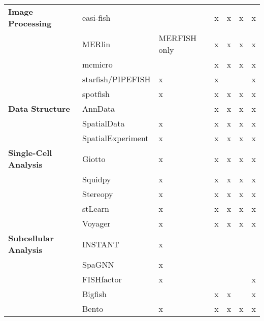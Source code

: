 \begin{dissertationintroduction}
\begin{small}
\begin{landscape}
\begin{longtable}{l l l l l l l}
            \textbf{Image Processing} & easi-fish & ~ & x & x & x & x \\ 
            \textbf{} & MERlin & MERFISH only & x & x & x & x \\ 
            \textbf{} & mcmicro & ~ & x & x & x & x \\ 
            \textbf{} & starfish/PIPEFISH & x & x & ~ & ~ & x \\ 
            \textbf{} & spotfish & x & x & x & x & x \\ 
            \textbf{Data Structure} & AnnData & ~ & x & x & x & x \\ 
            \textbf{} & SpatialData & x & x & x & x & x \\ 
            \textbf{} & SpatialExperiment & x & x & x & x & x \\ 
            \textbf{Single-Cell Analysis} & Giotto & x & x & x & x & x \\ 
            \textbf{} & Squidpy & x & x & x & x & x \\ 
            \textbf{} & Stereopy & x & x & x & x & x \\ 
            \textbf{} & stLearn & x & x & x & x & x \\ 
            \textbf{} & Voyager & x & x & x & x & x \\ 
            \textbf{Subcellular Analysis} & INSTANT & x & ~ & ~ & ~ & ~ \\ 
            \textbf{} & SpaGNN & x & ~ & ~ & ~ & ~ \\ 
            \textbf{} & FISHfactor & x & ~ & ~ & ~ & x \\ 
            \textbf{} & Bigfish & ~ & x & x & ~ & x \\ 
            \textbf{} & Bento & x & x & x & x & x \\ 
        \end{longtable}
    \end{landscape}
\end{small}


\end{dissertationintroduction}
